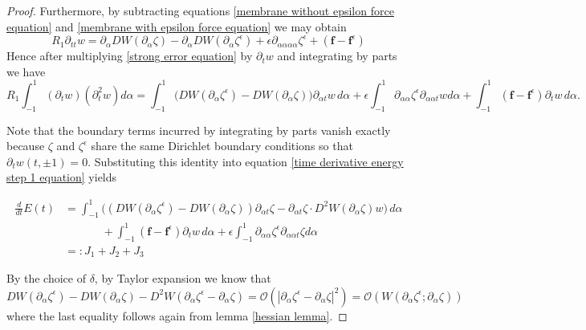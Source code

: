 \documentclass{article}[12pt]
\theoremstyle{Theorem}
\begin{document}
\begin{proof}
    Furthermore, by subtracting equations \eqref{membrane without epsilon force equation} and \eqref{membrane with epsilon force equation} we may obtain 
    \begin{equation}
         R_1\partial_{tt}w= \partial_\alpha DW(\partial_\alpha\zeta) - \partial_\alpha DW(\partial_\alpha\zeta^\epsilon) + \epsilon\partial_{\alpha\alpha\alpha\alpha} \zeta^\epsilon+(\boldsymbol{f} -\boldsymbol{f}^\epsilon)
         \label{strong error equation}
    \end{equation}
    Hence after multiplying \eqref{strong error equation} by $\partial_tw$ and integrating by parts we have
     \begin{equation}
         R_1\int_{-1}^1(\partial_tw)(\partial_t^2w)d\alpha = \int_{-1}^1\big(DW(\partial_\alpha\zeta^\epsilon) -DW(\partial_\alpha\zeta)\big)\partial_{\alpha t}w\, d\alpha +\epsilon\int_{-1}^1\partial_{\alpha\alpha}\zeta^{\epsilon}\partial_{\alpha\alpha t}wd\alpha + \int_{-1}^1(\boldsymbol{f} -\boldsymbol{f}^\epsilon)\partial_tw\, d\alpha.
     \end{equation}

     Note that the boundary terms incurred by integrating by parts vanish exactly because $\zeta$ and $\zeta^\epsilon$ share the same Dirichlet boundary conditions so that $\partial_tw(t,\pm1) = 0$. Substituting this identity into equation \eqref{time derivative energy step 1 equation} yields

     \begin{align}
        \frac{d}{dt}E(t) &= \int_{-1}^1\bigg((DW(\partial_\alpha\zeta^\epsilon) -DW(\partial_\alpha\zeta))\partial_{\alpha t}\zeta - \partial_{\alpha t}\zeta \cdot D^2W(\partial_\alpha\zeta)w\bigg)\, d\alpha \nonumber \\ & \ \ \ \ \ \ \ \ \ \ \ \ \ \ \ + \int_{-1}^1(\boldsymbol{f} -\boldsymbol{f}^\epsilon)\partial_tw\, d\alpha
         + \epsilon\int_{-1}^1\partial_{\alpha \alpha}\zeta^\epsilon\partial_{\alpha\alpha t}\zeta d\alpha \\
        &=: J_1 + J_2 + J_3 
        \label{time derivative energy step 2 equation}
    \end{align}

    By the choice of $\delta$, by Taylor expansion we know that $$DW(\partial_\alpha\zeta^\epsilon) - DW(\partial_\alpha\zeta) - D^2W(\partial_\alpha\zeta^\epsilon-\partial_\alpha\zeta) = \mathcal{O}(|\partial_\alpha\zeta^\epsilon-\partial_\alpha\zeta|^2) = \mathcal{O}(W(\partial_\alpha\zeta^\epsilon;\partial_\alpha\zeta))$$
    where the last equality follows again from lemma \ref{hessian lemma}.
    

\end{proof}
\end{document}
